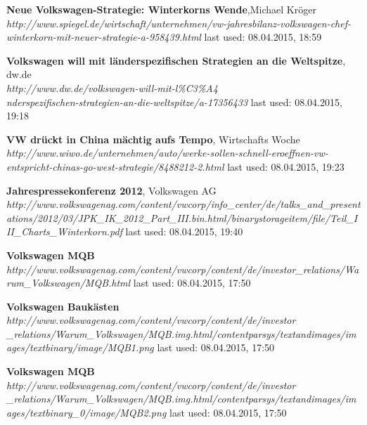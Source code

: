 \documentclass[12pt]{article}
\begin{document}
\begin{thebibliography}{56}
\textbf{Neue Volkswagen-Strategie: Winterkorns Wende},Michael Kröger \\
\textit{http://www.spiegel.de/wirtschaft/unternehmen/vw-jahresbilanz-volkswagen-chef-winterkorn-mit-neuer-strategie-a-958439.html}
\newline last used: 08.04.2015, 18:59


\textbf{Volkswagen will mit länderspezifischen Strategien an die Weltspitze}, dw.de \\
\textit{http://www.dw.de/volkswagen-will-mit-l\%C3\%A4\\nderspezifischen-strategien-an-die-weltspitze/a-17356433}
\newline last used: 08.04.2015, 19:18



\textbf{VW drückt in China mächtig aufs Tempo}, Wirtschafts Woche \\
\textit{http://www.wiwo.de/unternehmen/auto/werke-sollen-schnell-eroeffnen-vw-entspricht-chinas-go-west-strategie/8488212-2.html}
\newline last used: 08.04.2015, 19:23

\textbf{Jahrespressekonferenz 2012}, Volkswagen AG \\
\textit{http://www.volkswagenag.com/content/vwcorp/info\_center/de/talks\_and\_presentations/2012/03/JPK\_IK\_2012\_Part\_III.bin.html/binarystorageitem/file/Teil\_III\_Charts\_Winterkorn.pdf}
\newline last used: 08.04.2015, 19:40

\textbf{Volkswagen MQB} \\
\textit{
	http://www.volkswagenag.com/content/vwcorp/content/de/investor\_relations/Warum\_Volkswagen/MQB.html
}
\newline last used: 08.04.2015, 17:50

\textbf{Volkswagen Baukästen} \\
\textit{
	http://www.volkswagenag.com/content/vwcorp/content/de/investor\\ \_relations/Warum\_Volkswagen/MQB.img.html/contentparsys/textandimages/images/textbinary/image/MQB1.png
}
\newline last used: 08.04.2015, 17:50

\textbf{Volkswagen MQB} \\
\textit{
	http://www.volkswagenag.com/content/vwcorp/content/de/investor\\ \_relations/Warum\_Volkswagen/MQB.img.html/contentparsys/textandimages/images/textbinary\_0/image/MQB2.png
}
\newline last used: 08.04.2015, 17:50


\end{thebibliography}
\end{document}

